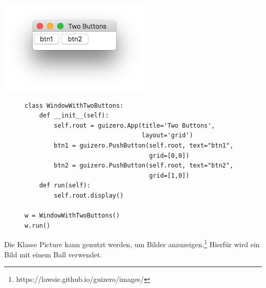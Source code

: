 \documentclass{tufte-handout}
\begin{document}
\begin{marginfigure}
	\begin{center}
		\includegraphics[width=\textwidth]{../with_2_buttons.png}
	\end{center}	
\end{marginfigure}

\begin{figure}
\begin{lstlisting}
class WindowWithTwoButtons:
    def __init__(self):
        self.root = guizero.App(title='Two Buttons', 
                                layout='grid')
        btn1 = guizero.PushButton(self.root, text="btn1",
                                  grid=[0,0])
        btn2 = guizero.PushButton(self.root, text="btn2",
                                  grid=[1,0])
    def run(self):
        self.root.display()

w = WindowWithTwoButtons()
w.run()

\end{lstlisting}
\end{figure} 

Die Klasse Picture kann genutzt werden, um Bilder anzuzeigen.\footnote{
	https://lawsie.github.io/guizero/images/} Hierfür wird ein
Bild mit einem Ball verwendet.
\end{document}
